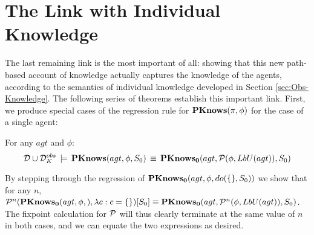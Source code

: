 \section{The Link with Individual Knowledge\label{sub:The-Link-with-IK}}

The last remaining link is the most important of all: showing that
this new path-based account of knowledge actually captures the knowledge
of the agents, according to the semantics of individual knowledge
developed in Section \ref{sec:Obs-Knowledge}. The following series
of theorems establish this important link. First, we produce special
cases of the regression rule for $\mathbf{PKnows}(\pi,\phi)$ for the case
of a single agent:

\begin{thm}
\label{thm:Pknows_LbU_S0}For any $agt$ and $\phi$:\[
\mathcal{D}\cup\mathcal{D}_{K}^{obs}\,\models\,\mathbf{PKnows}(agt,\phi,S_{0})\,\equiv\,\mathbf{PKnows_{0}}(agt,\mathcal{P}(\phi,LbU(agt)),S_{0})\]

\end{thm}
\begin{proofsketch}
By stepping through the regression of $\mathbf{PKnows_{0}}(agt,\phi,do(\{\},S_{0}))$
we show that for any $n$, $\mathcal{P}^{n}(\mathbf{PKnows_{0}}(agt,\phi,),\lambda c:c=\{\})[S_{0}]\equiv\mathbf{PKnows_{0}}(agt,\mathcal{P}^{n}(\phi,LbU(agt)),S_{0})$.
The fixpoint calculation for $\mathcal{P}$ will thus clearly terminate at
the same value of $n$ in both cases, and we can equate the two expressions
as desired. 
\end{proofsketch}
\medskip{}


